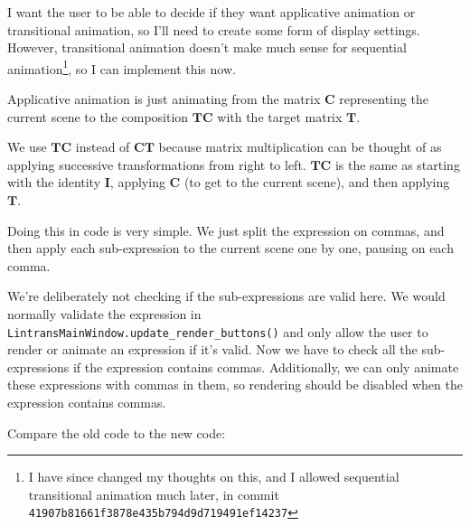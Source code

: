 \documentclass[../development.tex]{subfiles}
\begin{document}
I want the user to be able to decide if they want applicative animation or transitional animation, so I'll need to create some form of display settings. However, transitional animation doesn't make much sense for sequential animation\footnote{I have since changed my thoughts on this, and I allowed sequential transitional animation much later, in commit \texttt{41907b81661f3878e435b794d9d719491ef14237}}, so I can implement this now.

Applicative animation is just animating from the matrix $\mathbf{C}$ representing the current scene to the composition $\mathbf{TC}$ with the target matrix $\mathbf{T}$.

We use $\mathbf{TC}$ instead of $\mathbf{CT}$ because matrix multiplication can be thought of as applying successive transformations from right to left. $\mathbf{TC}$ is the same as starting with the identity $\mathbf{I}$, applying $\mathbf{C}$ (to get to the current scene), and then applying $\mathbf{T}$.

Doing this in code is very simple. We just split the expression on commas, and then apply each sub-expression to the current scene one by one, pausing on each comma.


We're deliberately not checking if the sub-expressions are valid here. We would normally validate the expression in \texttt{LintransMainWindow.update\_render\_buttons()} and only allow the user to render or animate an expression if it's valid. Now we have to check all the sub-expressions if the expression contains commas. Additionally, we can only animate these expressions with commas in them, so rendering should be disabled when the expression contains commas.

Compare the old code to the new code:


\end{document}
